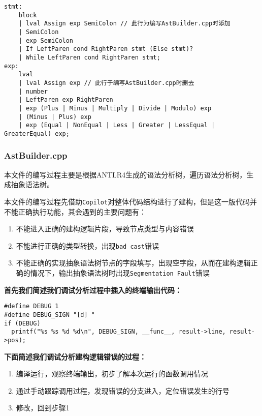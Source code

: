 \documentclass[../main.tex]{subfiles}
\begin{document}
\begin{mdframed}
	\begin{verbatim}
stmt: 
    block
    | lval Assign exp SemiColon // 此行为编写AstBuilder.cpp时添加
    | SemiColon
    | exp SemiColon
    | If LeftParen cond RightParen stmt (Else stmt)?
    | While LeftParen cond RightParen stmt;
exp:
    lval
    | lval Assign exp // 此行于编写AstBuilder.cpp时删去
    | number
    | LeftParen exp RightParen
    | exp (Plus | Minus | Multiply | Divide | Modulo) exp
    | (Minus | Plus) exp
    | exp (Equal | NonEqual | Less | Greater | LessEqual | GreaterEqual) exp;
  \end{verbatim}
\end{mdframed}

\subsubsection{AstBuilder.cpp}

本文件的编写过程主要是根据ANTLR4生成的语法分析树，遍历语法分析树，生成抽象语法树。

本文件的编写过程先借助\texttt{Copilot}对整体代码结构进行了建构，但是这一版代码并不能正确执行功能，其会遇到的主要问题有：

\begin{enumerate}
	\item 不能进入正确的建构逻辑片段，导致节点类型与内容错误
	\item 不能进行正确的类型转换，出现\texttt{bad cast}错误
	\item 不能正确的实现抽象语法树节点的字段填写，出现空字段，从而在建构逻辑正确的情况下，输出抽象语法树时出现\texttt{Segmentation Fault}错误
\end{enumerate}

\textbf{首先我们简述我们调试分析过程中插入的终端输出代码：}

\begin{mdframed}
	\begin{verbatim}
#define DEBUG 1
#define DEBUG_SIGN "[d] "
if (DEBUG)
  printf("%s %s %d %d\n", DEBUG_SIGN, __func__, result->line, result->pos);
  \end{verbatim}
\end{mdframed}


\textbf{下面简述我们调试分析建构逻辑错误的过程：}

\begin{enumerate}
	\item 编译运行，观察终端输出，初步了解本次运行的函数调用情况
	\item 通过手动跟踪调用过程，发现错误的分支进入，定位错误发生的行号
	\item 修改，回到步骤1
\end{enumerate}
\end{document}
